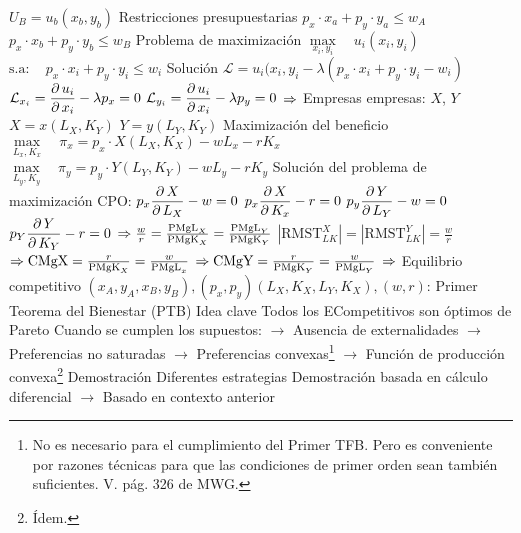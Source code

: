\documentclass{nuevotema}
\begin{document}
\begin{esquemal}
				\4[] $U_B = u_b(x_b, y_b)$
				\4 Restricciones presupuestarias
				\4[] $p_x \cdot x_a + p_y \cdot y_a \leq w_A$
				\4[] $p_x \cdot x_b + p_y \cdot y_b \leq w_B$
				\4 Problema de maximización
				\4[] $\underset{x_i, y_i}{\max} \quad u_i(x_i, y_i)$
				\4[] \quad $\text{s.a}: \quad p_x \cdot x_i + p_y \cdot y_i \leq w_i$
				\4 Solución
				\4[] $\mathcal{L} = u_i(x_i, y_i - \lambda (p_x \cdot x_i + p_y \cdot y_i - w_i)$
				\4[] $\mathcal{L}_{x_i} = \dfrac{\partial \, u_i}{\partial \, x_i} - \lambda p_x = 0$
				\4[] $\mathcal{L}_{y_i} = \dfrac{\partial \, u_i}{\partial \, x_i} - \lambda p_y = 0$
				\4[] $\Rightarrow$ 
			\3 Empresas
				 empresas: $X$, $Y$
				\4[] $X = x(L_X, K_Y)$
				\4[] $Y = y(L_Y, K_Y)$
				\4 Maximización del beneficio
				\4[] $\underset{L_x, K_x}{\max} \quad \pi_x = p_x \cdot X(L_X, K_X) - w L_x - r K_x$
				\4[] $\underset{L_y, K_y}{\max} \quad \pi_y = p_y \cdot Y(L_Y, K_Y) - w L_y - r K_y$
				\4 Solución del problema de maximización
				\4[] CPO:
				\4[] $p_x \dfrac{\partial \, X}{\partial \, L_X} - w = 0$
				\4[] $p_x \dfrac{\partial \, X}{\partial \, K_x} - r = 0$
				\4[] $p_y \dfrac{\partial \, Y}{\partial \, L_Y} - w = 0$
				\4[] $p_Y \dfrac{\partial \, Y}{\partial \, K_Y} - r = 0$
				\4[] $\Rightarrow \frac{w}{r} = \frac{\text{PMgL}_X}{\text{PMgK}_X} = \frac{\text{PMgL}_Y}{\text{PMgK}_Y}$
				\4[] $\left| \text{RMST}_{LK}^X \right| = \left| \text{RMST}_{LK}^Y \right| = \frac{w}{r}$
				\4[] $\Rightarrow \text{CMgX} = \frac{r}{\text{PMgK}_X} = \frac{w}{\text{PMgL}_x}$
				\4[] $\Rightarrow \text{CMgY} = \frac{r}{\text{PMgK}_Y} = \frac{w}{\text{PMgL}_Y}$
				\4[] $\Rightarrow$ 
			\3 Equilibrio competitivo
				\4 $(x_A, y_A, x_B, y_B), (p_x, p_y) (L_X, K_X, L_Y, K_X), (w,r)$:
				\4[] 
		\2 Primer Teorema del Bienestar (PTB)
			\3 Idea clave
				\4 Todos los ECompetitivos son óptimos de Pareto
				\4[] Cuando se cumplen los supuestos:
				\4[] $\to$ Ausencia de externalidades
				\4[] $\to$ Preferencias no saturadas
				\4[] $\to$ Preferencias convexas\footnote{No es necesario para el cumplimiento del Primer TFB. Pero es conveniente por razones técnicas para que las condiciones de primer orden sean también suficientes. V. pág. 326 de MWG.}
				\4[] $\to$ Función de producción convexa\footnote{Ídem.}
				\4 Demostración
				\4[] Diferentes estrategias
				\4[] Demostración basada en cálculo diferencial
				\4[] $\to$ Basado en contexto anterior

\end{esquemal}
\end{document}
